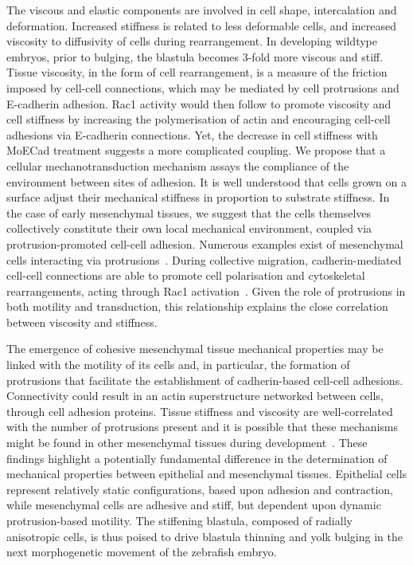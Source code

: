The viscous and elastic components are involved in cell shape, intercalation and deformation.
Increased stiffness is related to less deformable cells, and increased viscosity to diffusivity of cells during rearrangement.
In developing wildtype embryos, prior to bulging, the blastula becomes 3-fold more viscous and stiff.
Tissue viscosity, in the form of cell rearrangement, is a measure of the friction imposed by cell-cell connections, which may be mediated by cell protrusions and
E-cadherin adhesion.
\gls{Rac1} activity would then follow to promote viscosity and cell stiffness by increasing the polymerisation of actin and encouraging cell-cell adhesions via E-cadherin connections.
Yet, the decrease in cell stiffness with MoECad treatment suggests a more complicated coupling. %
We propose that a cellular mechanotransduction mechanism assays the compliance of the environment between sites of adhesion.
It is well understood that cells grown on a surface adjust their mechanical stiffness in proportion to substrate stiffness. %
In the case of early mesenchymal tissues, we suggest that the cells themselves collectively constitute their own local mechanical environment, coupled via protrusion-promoted cell-cell adhesion.
Numerous examples exist of mesenchymal cells interacting via protrusions~\cite{}.
During collective migration, cadherin-mediated cell-cell connections are able to promote cell polarisation and cytoskeletal rearrangements, acting through \gls{Rac1} activation~\cite{}.
Given the role of protrusions in both motility and transduction, this relationship explains the close correlation between viscosity and stiffness.

The emergence of cohesive mesenchymal tissue mechanical properties may be linked with the motility of its cells and, in particular, the formation of protrusions that facilitate the establishment of cadherin-based cell-cell adhesions.
Connectivity could result in an actin superstructure networked between cells, through cell adhesion proteins.
Tissue stiffness and viscosity are well-correlated with the number of protrusions present and it is possible that these mechanisms might be found in other mesenchymal tissues during development~\cite{}. %
These findings highlight a potentially fundamental difference in the determination of mechanical properties between epithelial and mesenchymal tissues.
Epithelial cells represent relatively static configurations, based upon adhesion and contraction, while mesenchymal cells are adhesive and stiff, but dependent upon dynamic protrusion-based motility.
The stiffening blastula, composed of radially anisotropic cells, is thus poised to drive blastula thinning and yolk bulging in the next morphogenetic movement of the zebrafish embryo.


